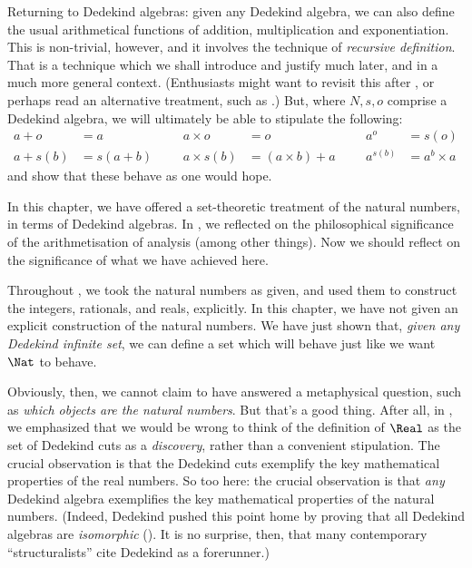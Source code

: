 Returning to Dedekind algebras: given any Dedekind algebra, we can
also define the usual arithmetical functions of addition,
multiplication and exponentiation. This is non-trivial, however, and
it involves the technique of \emph{recursive definition}. That is a
technique which we shall introduce and justify much later, and in a
much more general context. (Enthusiasts might want to revisit this
after , or perhaps read an alternative
treatment, such as \citealt[pp.~95--8]{Potter2004}.) But, where $N, s, o$
comprise a Dedekind algebra, we will ultimately be able to stipulate the
following:
\begin{align*}
	{a} + {o} &= {a} & & & {a} \times {o} &= {o} & & & {a}^{o} &= s(o)\\
{a} + {s}({b}) &= {s}({a}+{b}) &&& {a} \times {s}({b}) &= ({a}\times {b}) + {a}  & & & {a}^{{s}({b})} &= {a}^{b} \times {a}
\end{align*}
and show that these behave as one would hope.






In this chapter, we have offered a set-theoretic treatment of the
natural numbers, in terms of Dedekind algebras. In
, we reflected on the philosophical
significance of the arithmetisation of analysis (among other things).
Now we should reflect on the significance of what we have achieved
here.

Throughout , we took the natural numbers as
given, and used them to construct the integers, rationals, and reals,
explicitly. In this chapter, we have not given an explicit
construction of the natural numbers. We have just shown that,
\emph{given any Dedekind infinite set}, we can define a set which will
behave just like we want~$\Nat$ to behave. 

Obviously, then, we cannot claim to have answered a metaphysical
question, such as \emph{which objects are the natural numbers}. But
that's a good thing. After all, in  , we
emphasized that we would be wrong to think of the definition of
$\Real$ as the set of Dedekind cuts as a \emph{discovery}, rather than
a convenient stipulation. The crucial observation is that the Dedekind
cuts exemplify the key mathematical properties of the real
numbers. So too here: the crucial observation is that \emph{any}
Dedekind algebra exemplifies the key mathematical properties of the
natural numbers. (Indeed, Dedekind pushed this point home by proving
that all Dedekind algebras are \emph{isomorphic} (\citeyear[Theorems
132--3]{Dedekind1888}). It is no surprise, then, that many
contemporary ``structuralists'' cite Dedekind as a forerunner.)

